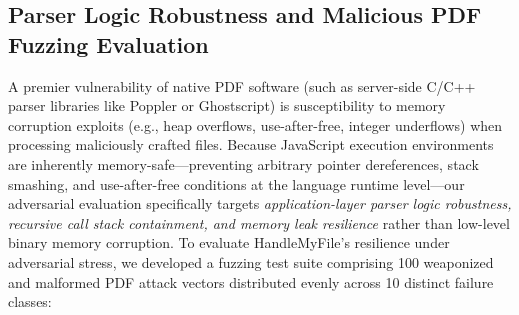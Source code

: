 \documentclass[journal]{IEEEtran}
\begin{document}
\subsection{Parser Logic Robustness and Malicious PDF Fuzzing Evaluation}
A premier vulnerability of native PDF software (such as server-side C/C++ parser libraries like Poppler or Ghostscript) is susceptibility to memory corruption exploits (e.g., heap overflows, use-after-free, integer underflows) when processing maliciously crafted files. Because JavaScript execution environments are inherently memory-safe---preventing arbitrary pointer dereferences, stack smashing, and use-after-free conditions at the language runtime level---our adversarial evaluation specifically targets \textit{application-layer parser logic robustness, recursive call stack containment, and memory leak resilience} rather than low-level binary memory corruption. To evaluate HandleMyFile's resilience under adversarial stress, we developed a fuzzing test suite comprising 100 weaponized and malformed PDF attack vectors distributed evenly across 10 distinct failure classes:

\begin{table}[!t]
\centering
\caption{Adversarial Stress and Malicious PDF Fuzzing Resilience}
\label{tab_fuzzing}
\end{table}
\end{document}
